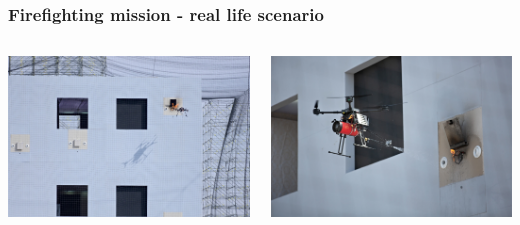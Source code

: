 \begin{frame}
	\frametitle{Firefighting mission - real life scenario}
	\begin{columns}
		\begin{column}{0.5\textwidth}\centering
			\begin{center}
				\includegraphics[width=1\textwidth]{figures/mbzirc_1}
				\label{fig:forest_uav}
			\end{center}
		\end{column}
		\begin{column}{0.5\textwidth}\centering
			\begin{center}
				\includegraphics[width=1\textwidth]{figures/mbzirc_2}
				\label{fig:forest_uav}
			\end{center}
		\end{column}
	\end{columns}
	
\end{frame}